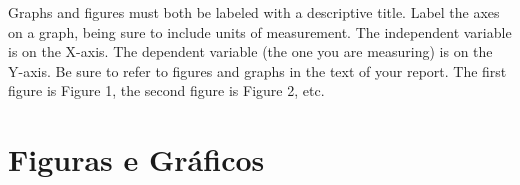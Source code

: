 

Graphs and figures must both be labeled with a descriptive title. Label the axes on a graph, being sure to include units of measurement. The independent variable is on the X-axis. The dependent variable (the one you are measuring) is on the Y-axis. Be sure to refer to figures and graphs in the text of your report. The first figure is Figure 1, the second figure is Figure 2, etc.


\section{Figuras e Gráficos}
\label{figuras}
